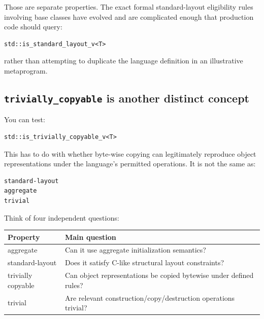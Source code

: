 Those are separate properties. The exact formal standard-layout eligibility rules involving base classes have evolved and are complicated enough that production code should query:

\begin{verbatim}
std::is_standard_layout_v<T>
\end{verbatim}

rather than attempting to duplicate the language definition in an illustrative metaprogram.

\subsection{\texorpdfstring{\texttt{trivially\_copyable} is another distinct concept}{trivially\_copyable is another distinct concept}}\label{01-foundations-i-ch003-trivially_copyable-is-another-distinct-concept}

You can test:

\begin{verbatim}
std::is_trivially_copyable_v<T>
\end{verbatim}

This has to do with whether byte-wise copying can legitimately reproduce object representations under the language's permitted operations. It is not the same as:

\begin{verbatim}
standard-layout
aggregate
trivial
\end{verbatim}

Think of four independent questions:

{\def\LTcaptype{none} %
\begin{longtable}[]{@{}
  >{\raggedright\arraybackslash}p{}
  >{\raggedright\arraybackslash}p{}@{}}
\toprule\noalign{}
\begin{minipage}[b]{\linewidth}\raggedright
Property
\end{minipage} & \begin{minipage}[b]{\linewidth}\raggedright
Main question
\end{minipage} \\
\midrule\noalign{}
\endhead
\bottomrule\noalign{}
\endlastfoot
aggregate & Can it use aggregate initialization semantics? \\
standard-layout & Does it satisfy C-like structural layout constraints? \\
trivially copyable & Can object representations be copied bytewise under defined rules? \\
trivial & Are relevant construction/copy/destruction operations trivial? \\
\end{longtable}
}

